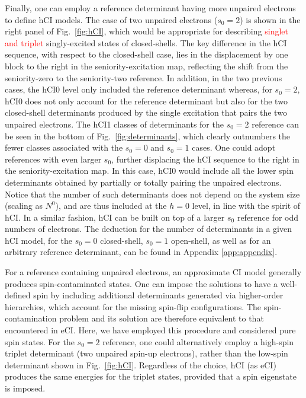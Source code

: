 \documentclass[aip,jcp,reprint,noshowkeys,superscriptaddress]{revtex4-1}
\newcommand{\titou}[1]{\textcolor{red}{#1}}
\begin{document}
Finally, one can employ a reference determinant having more unpaired electrons to define hCI models.
The case of two unpaired electrons ($s_0=2$) is shown in the right panel of Fig.~\ref{fig:hCI},
which would be appropriate for describing \titou{singlet and triplet} singly-excited states of closed-shells.
The key difference in the hCI sequence, with respect to the closed-shell case, lies in the displacement by one block to the right in the seniority-excitation map,
reflecting the shift from the seniority-zero to the seniority-two reference.
In addition, in the two previous cases, the hCI0 level only included the reference determinant
whereas, for $s_0=2$, hCI0 does not only account for the reference determinant
but also for the two closed-shell determinants produced by the single excitation that pairs the two unpaired electrons.
The hCI1 classes of determinants for the $s_0=2$ reference can be seen in the bottom of Fig.~\ref{fig:determinants},
which clearly outnumbers the fewer classes associated with the $s_0=0$ and $s_0=1$ cases.
One could adopt references with even larger $s_0$, further displacing the hCI sequence to the right in the seniority-excitation map.
In this case, hCI0 would include all the lower spin determinants obtained by partially or totally pairing the unpaired electrons.
Notice that the number of such determinants does not depend on the system size (scaling as $N^0$), and are thus included at the $h=0$ level, in line with the spirit of hCI.
In a similar fashion, hCI can be built on top of a larger $s_0$ reference for odd numbers of electrons.
The deduction for the number of determinants in a given hCI model, for the $s_0=0$ closed-shell, $s_0=1$ open-shell, as well as for an arbitrary reference determinant, can be found in Appendix \ref{app:appendix}.

For a reference containing unpaired electrons, an approximate CI model generally produces spin-contaminated states.
One can impose the solutions to have a well-defined spin by including additional determinants generated via higher-order hierarchies, which account for the missing spin-flip configurations.
The spin-contamination problem and its solution are therefore equivalent to that encountered in eCI. \cite{Maurice_1996}
Here, we have employed this procedure and considered pure spin states.
For the $s_0 = 2$ reference, one could alternatively employ a high-spin triplet determinant (two unpaired spin-up electrons), 
rather than the low-spin determinant shown in Fig.~\ref{fig:hCI}.
Regardless of the choice, hCI (as eCI) produces the same energies for the triplet states, provided that a spin eigenstate is imposed.
\end{document}
